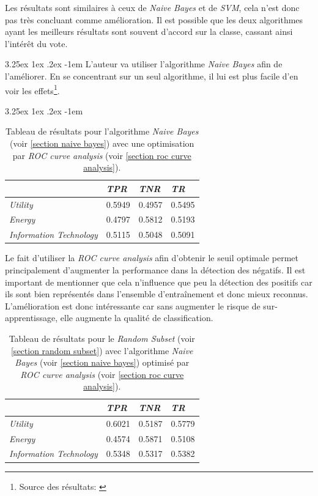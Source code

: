 \documentclass[a4paper, 11pt]{article}
\makeatletter
\renewcommand\paragraph{\@startsection{paragraph}{5}{\z@}%
  {3.25ex \@plus1ex \@minus.2ex}%
  {-1em}%
  {\normalfont\normalsize\bfseries}}
\makeatother
\begin{document}
Les résultats sont similaires à ceux de \textit{Naive Bayes} et de \textit{SVM}, cela n'est donc pas très
concluant comme amélioration. Il est possible que les deux algorithmes ayant les meilleurs résultats sont
souvent d'accord sur la classe, cassant ainsi l'intérêt du vote.

\paragraph{}
L'auteur va utiliser l'algorithme \textit{Naive Bayes} afin de l'améliorer. En se concentrant sur un seul algorithme,
il lui est plus facile d'en voir les effets\footnote{Source des résultats: \cite{machine_learning_automated_trading}}.

\paragraph{}
\begin{table}[h!]
	\centering
\begin{tabular}{|l|l|l|l|}
	\hline
	\ & \textit{TPR} & \textit{TNR} & \textit{TR}\\
	\hline
	\textit{Utility} & 0.5949 & 0.4957 & 0.5495 \\
	\hline
	\textit{Energy} & 0.4797 & 0.5812 & 0.5193\\
	\hline
	\textit{Information Technology} & 0.5115 & 0.5048 & 0.5091\\
	\hline
\end{tabular}
\caption{Tableau de résultats pour l'algorithme \textit{Naive Bayes} (voir \ref{section naive bayes}) avec une optimisation
par \textit{ROC curve analysis} (voir \ref{section roc curve analysis}).}
\end{table}

Le fait d'utiliser la \textit{ROC curve analysis} afin d'obtenir le seuil optimale permet principalement d'augmenter
la performance dans la détection des négatifs. Il est important de mentionner que cela n'influence que peu
la détection des positifs car ils sont bien représentés dans l'ensemble d'entraînement et donc mieux reconnus.
L'amélioration est donc intéressante car sans augmenter le risque de sur-apprentissage, elle augmente la qualité
de classification.

\begin{table}[h!]
	\centering
\begin{tabular}{|l|l|l|l|}
	\hline
	\ & \textit{TPR} & \textit{TNR} & \textit{TR}\\
	\hline
	\textit{Utility} & 0.6021 & 0.5187 & 0.5779 \\
	\hline
	\textit{Energy} & 0.4574 & 0.5871 & 0.5108\\
	\hline
	\textit{Information Technology} & 0.5348 & 0.5317 & 0.5382\\
	\hline
\end{tabular}
\caption{Tableau de résultats pour le \textit{Random Subset} (voir \ref{section random subset}) avec l'algorithme 
\textit{Naive Bayes} (voir \ref{section naive bayes}) optimisé par \textit{ROC curve analysis} 
(voir \ref{section roc curve analysis}).}
\end{table}
\end{document}
